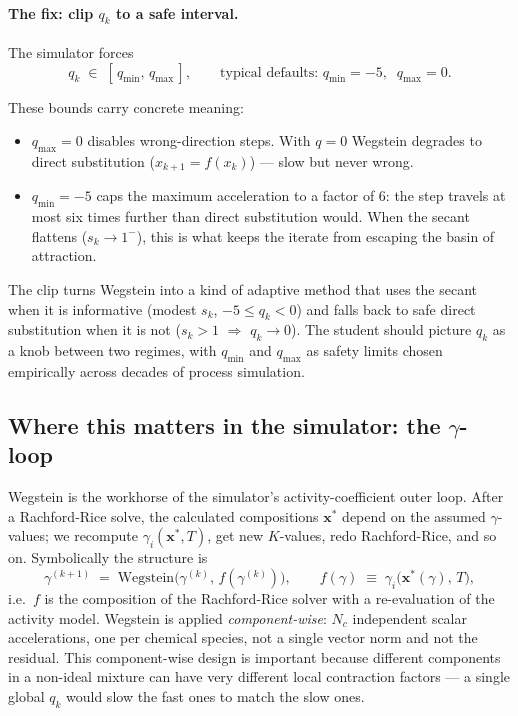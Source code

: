 \documentclass[11pt,a4paper]{article}
\newcommand{\xv}{\mathbf{x}}
\begin{document}
\paragraph{The fix: clip $q_k$ to a safe interval.}  The simulator
forces
\begin{equation}
   q_k \;\in\; [\,q_{\min},\,q_{\max}\,],
   \qquad
   \text{typical defaults: } q_{\min} = -5,\;\; q_{\max} = 0.
   \label{eq:wegstein-clip}
\end{equation}

These bounds carry concrete meaning:

\begin{itemize}[leftmargin=*,nosep,topsep=2pt]
  \item $q_{\max} = 0$ disables wrong-direction steps.  With $q = 0$
        Wegstein degrades to direct substitution
        ($x_{k+1} = f(x_k)$) --- slow but never wrong.
  \item $q_{\min} = -5$ caps the maximum acceleration to a factor
        of 6: the step travels at most six times further than
        direct substitution would.  When the secant flattens
        ($s_k \to 1^-$), this is what keeps the iterate from
        escaping the basin of attraction.
\end{itemize}

\begin{intuition}
The clip turns Wegstein into a kind of adaptive method that uses the
secant when it is informative (modest $s_k$, $-5 \le q_k < 0$) and
falls back to safe direct substitution when it is not ($s_k > 1$
$\Rightarrow$ $q_k \to 0$).  The student should picture
$q_k$ as a knob between two regimes, with $q_{\min}$ and $q_{\max}$
as safety limits chosen empirically across decades of process
simulation.
\end{intuition}

\subsection{Where this matters in the simulator: the
$\gamma$-loop}

Wegstein is the workhorse of the simulator's activity-coefficient
outer loop.  After a Rachford-Rice solve, the calculated
compositions $\xv^{\!*}$ depend on the assumed $\gamma$-values; we
recompute $\gamma_i(\xv^{\!*}, T)$, get new $K$-values, redo
Rachford-Rice, and so on.  Symbolically the structure is
\[
   \gamma^{(k+1)} \;=\; \mathrm{Wegstein}\bigl(\gamma^{(k)},\,f(\gamma^{(k)})\bigr),
   \qquad
   f(\gamma) \;\equiv\; \gamma_i\!\bigl(\xv^{\!*}(\gamma),\,T\bigr),
\]
i.e.\ $f$ is the composition of the Rachford-Rice solver with a
re-evaluation of the activity model.  Wegstein is applied
\emph{component-wise}: $N_c$ independent scalar accelerations, one
per chemical species, not a single vector norm and not the
residual.  This component-wise design is important because different
components in a non-ideal mixture can have very different local
contraction factors --- a single global $q_k$ would slow the fast
ones to match the slow ones.
\end{document}
